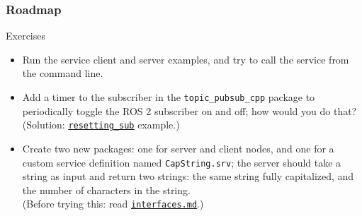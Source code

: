 \documentclass[aspectratio=169]{beamer}
\begin{document}
\frame{\titlepage}



\begin{frame}
	\frametitle{Roadmap}
	\tableofcontents
\end{frame}





\begin{frame}{Exercises}
	\begin{itemize}
    \item Run the service client and server examples, and try to call the service from the command line.
		\item Add a timer to the subscriber in the \texttt{topic\_pubsub\_cpp} package to periodically toggle the ROS 2 subscriber on and off; how would you do that?\\
		      (Solution: \href{https://github.com/IntelligentSystemsLabUTV/ros2-examples/blob/humble/src/cpp/topic_pubsub_cpp/src/resetting_sub.cpp}{\color{blue}\underline{\texttt{resetting\_sub}}} example.)
		\item Create two new packages: one for server and client nodes, and one for a custom service definition named \texttt{CapString.srv}; the server should take a string as input and return two strings: the same string fully capitalized, and the number of characters in the string.\\
		      (Before trying this: read \href{https://github.com/IntelligentSystemsLabUTV/ros2-examples/blob/jazzy/interfaces.md}{\color{blue}\underline{\texttt{interfaces.md}}}.)
	\end{itemize}
\end{frame}
\end{document}
